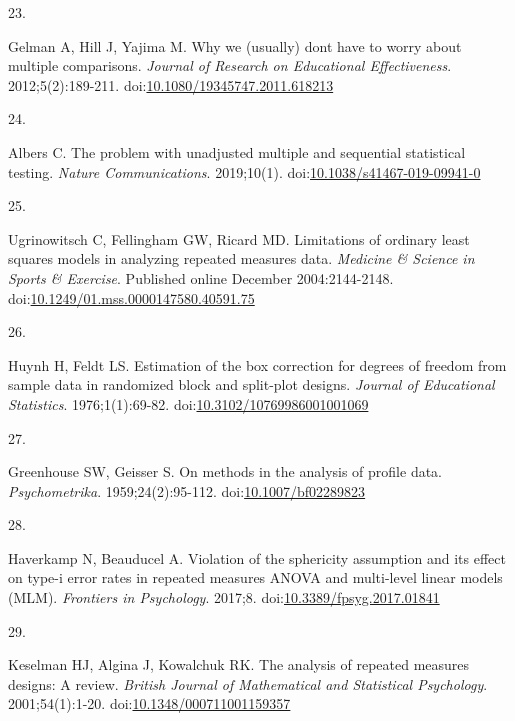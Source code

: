 \documentclass[
]{article}
\newlength{\cslhangindent}
\newlength{\csllabelwidth}
\newlength{\cslentryspacingunit} %
\newenvironment{CSLReferences}[2] %
 {%
  \setlength{\parindent}{0pt}
  \ifodd #1
  \let\oldpar\par
  \def\par{\hangindent=\cslhangindent\oldpar}
  \fi
  \setlength{\parskip}{#2\cslentryspacingunit}
 }%
 {}
\newcommand{\CSLLeftMargin}[1]{\parbox[t]{\csllabelwidth}{#1}}
\newcommand{\CSLRightInline}[1]{\parbox[t]{\linewidth - \csllabelwidth}{#1}\break}
\begin{document}
\begin{CSLReferences}{0}{0}
\leavevmode{}%
\CSLLeftMargin{23. }
\CSLRightInline{Gelman A, Hill J, Yajima M. Why we (usually) don{\textquotesingle}t have to worry about multiple comparisons. \emph{Journal of Research on Educational Effectiveness}. 2012;5(2):189-211. doi:\href{https://doi.org/10.1080/19345747.2011.618213}{10.1080/19345747.2011.618213}}

\leavevmode{}%
\CSLLeftMargin{24. }
\CSLRightInline{Albers C. The problem with unadjusted multiple and sequential statistical testing. \emph{Nature Communications}. 2019;10(1). doi:\href{https://doi.org/10.1038/s41467-019-09941-0}{10.1038/s41467-019-09941-0}}

\leavevmode{}%
\CSLLeftMargin{25. }
\CSLRightInline{Ugrinowitsch C, Fellingham GW, Ricard MD. Limitations of ordinary least squares models in analyzing repeated measures data. \emph{Medicine {\&} Science in Sports {\&} Exercise}. Published online December 2004:2144-2148. doi:\href{https://doi.org/10.1249/01.mss.0000147580.40591.75}{10.1249/01.mss.0000147580.40591.75}}

\leavevmode{}%
\CSLLeftMargin{26. }
\CSLRightInline{Huynh H, Feldt LS. Estimation of the box correction for degrees of freedom from sample data in randomized block and split-plot designs. \emph{Journal of Educational Statistics}. 1976;1(1):69-82. doi:\href{https://doi.org/10.3102/10769986001001069}{10.3102/10769986001001069}}

\leavevmode{}%
\CSLLeftMargin{27. }
\CSLRightInline{Greenhouse SW, Geisser S. On methods in the analysis of profile data. \emph{Psychometrika}. 1959;24(2):95-112. doi:\href{https://doi.org/10.1007/bf02289823}{10.1007/bf02289823}}

\leavevmode{}%
\CSLLeftMargin{28. }
\CSLRightInline{Haverkamp N, Beauducel A. Violation of the sphericity assumption and its effect on type-i error rates in repeated measures {ANOVA} and multi-level linear models ({MLM}). \emph{Frontiers in Psychology}. 2017;8. doi:\href{https://doi.org/10.3389/fpsyg.2017.01841}{10.3389/fpsyg.2017.01841}}

\leavevmode{}%
\CSLLeftMargin{29. }
\CSLRightInline{Keselman HJ, Algina J, Kowalchuk RK. The analysis of repeated measures designs: A review. \emph{British Journal of Mathematical and Statistical Psychology}. 2001;54(1):1-20. doi:\href{https://doi.org/10.1348/000711001159357}{10.1348/000711001159357}}


\end{CSLReferences}
\end{document}
